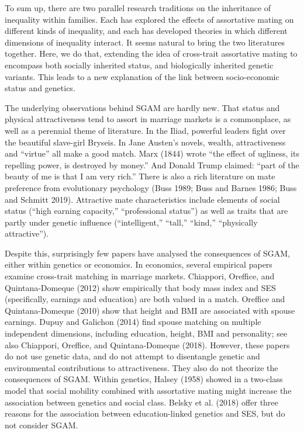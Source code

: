 \documentclass[
]{article}
\begin{document}
To sum up, there are two parallel research traditions on the inheritance
of inequality within families. Each has explored the effects of
assortative mating on different kinds of inequality, and each has
developed theories in which different dimensions of inequality interact.
It seems natural to bring the two literatures together. Here, we do
that, extending the idea of cross-trait assortative mating to encompass
both socially inherited status, and biologically inherited genetic
variants. This leads to a new explanation of the link between
socio-economic status and genetics.

The underlying observations behind SGAM are hardly new. That status and
physical attractiveness tend to assort in marriage markets is a
commonplace, as well as a perennial theme of literature. In the Iliad,
powerful leaders fight over the beautiful slave-girl Bryseis. In Jane
Austen's novels, wealth, attractiveness and ``virtue'' all make a good
match. Marx (1844) wrote ``the effect of ugliness, its repelling
power, is destroyed by money.'' And Donald Trump claimed: ``part of the
beauty of me is that I am very rich.'' There is also a rich literature on
mate preference from evolutionary psychology (Buss 1989; Buss and Barnes 1986; Buss and Schmitt 2019). Attractive mate characteristics
include elements of social status (``high earning capacity,''
``professional status'') as well as traits that are partly under genetic
influence (``intelligent,'' ``tall,'' ``kind,'' ``physically attractive'').

Despite this, surprisingly few papers have analysed the consequences of
SGAM, either within genetics or economics. In economics, several
empirical papers examine cross-trait matching in marriage markets.
Chiappori, Oreffice, and Quintana-Domeque (2012) show empirically that body mass index and SES
(specifically, earnings and education) are both valued in a match.
Oreffice and Quintana-Domeque (2010) show that height and BMI are associated with
spouse earnings. Dupuy and Galichon (2014) find spouse matching on multiple
independent dimensions, including education, height, BMI and
personality; see also Chiappori, Oreffice, and Quintana-Domeque (2018). However, these papers
do not use genetic data, and do not attempt to disentangle genetic and
environmental contributions to attractiveness. They also do not theorize
the consequences of SGAM. Within genetics, Halsey (1958) showed in
a two-class model that social mobility combined with assortative mating
might increase the association between genetics and social class.
Belsky et al. (2018) offer three reasons for the association between
education-linked genetics and SES, but do not consider SGAM.
\end{document}
